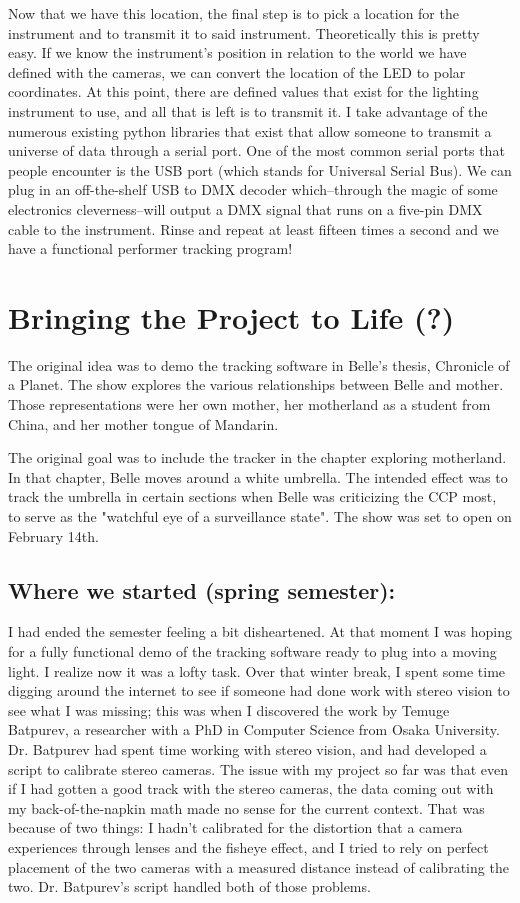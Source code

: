 \documentclass[
    12pt,
    twoside,
    bibstyle=chicago,
    headerstyle=uppercase,
	bibfile=thesis.bib
]{reedthesis}
\begin{document}
Now that we have this location, the final step is to pick a location for the instrument and to transmit it to said instrument. Theoretically this is pretty easy. If we know the instrument's position in relation to the world we have defined with the cameras, we can convert the location of the LED to polar coordinates. At this point, there are defined values that exist for the lighting instrument to use, and all that is left is to transmit it. I take advantage of the numerous existing python libraries that exist that allow someone to transmit a universe of data through a serial port. One of the most common serial ports that people encounter is the USB port (which stands for Universal Serial Bus). We can plug in an off-the-shelf USB to DMX decoder which–through the magic of some electronics cleverness–will output a DMX signal that runs on a five-pin DMX cable to the instrument. Rinse and repeat at least fifteen times a second and we have a functional performer tracking program!

\chapter{Bringing the Project to Life (?)}
The original idea was to demo the tracking software in Belle's thesis, Chronicle of a Planet. The show explores the various relationships between Belle and mother. Those representations were her own mother, her motherland as a student from China, and her mother tongue of Mandarin.

The original goal was to include the tracker in the chapter exploring motherland. In that chapter, Belle moves around a white umbrella. The intended effect was to track the umbrella in certain sections when Belle was criticizing the CCP most, to serve as the "watchful eye of a surveillance state". The show was set to open on February 14th.

\section{Where we started (spring semester):}

I had ended the semester feeling a bit disheartened. At that moment I was hoping for a fully functional demo of the tracking software ready to plug into a moving light. I realize now it was a lofty task. Over that winter break, I spent some time digging around the internet to see if someone had done work with stereo vision to see what I was missing; this was when I discovered the work by Temuge Batpurev, a researcher with a PhD in Computer Science from Osaka University. Dr. Batpurev had spent time working with stereo vision, and had developed a script to calibrate stereo cameras. The issue with my project so far was that even if I had gotten a good track with the stereo cameras, the data coming out with my back-of-the-napkin math made no sense for the current context. That was because of two things: I hadn't calibrated for the distortion that a camera experiences through lenses and the fisheye effect, and I tried to rely on perfect placement of the two cameras with a measured distance instead of calibrating the two. Dr. Batpurev's script handled both of those problems.
\end{document}
